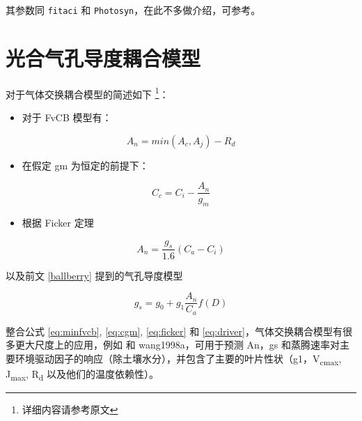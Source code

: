 \documentclass[]{krantz}
\providecommand{\tightlist}{%
  \setlength{\itemsep}{0pt}\setlength{\parskip}{0pt}}
\theoremstyle{definition}
\theoremstyle{definition}
\theoremstyle{definition}
\theoremstyle{remark}
\begin{document}
其参数同 \texttt{fitaci} 和
\texttt{Photosyn}，在此不多做介绍，可参考\citep[\citet{Buckley2014Is},
\citet{Medlyn2011Reconciling}]{Cowan1977Stomatal}。

\cleardoublepage

\chapter{光合气孔导度耦合模型}\label{photo_stomo}

\citet{Duursma2015Plantecophys} 对于气体交换耦合模型的简述如下
\footnote{详细内容请参考原文}：

\begin{itemize}
\tightlist
\item
  对于 FvCB 模型有：
\end{itemize}

\begin{equation}
A_n = min(A_c, A_j)-R_d
\label{eq:minfvcb}
\end{equation}

\begin{itemize}
\tightlist
\item
  在假定 gm 为恒定的前提下：
\end{itemize}

\begin{equation}
C_c = C_i - \frac{A_n}{g_m}
\label{eq:cgm}
\end{equation}

\begin{itemize}
\tightlist
\item
  根据 Ficker 定理
\end{itemize}

\begin{equation}
A_n = \frac{g_s}{1.6}(C_a - C_i)
\label{eq:ficker}
\end{equation}

以及前文 \ref{ballberry} 提到的气孔导度模型

\begin{equation}
g_s = g_0 + g_1 \frac{A_n}{C_a} f(D)
\label{eq:driver}
\end{equation}

整合公式 \eqref{eq:minfvcb}, \eqref{eq:cgm}, \eqref{eq:ficker} 和
\eqref{eq:driver}，气体交换耦合模型有很多更大尺度上的应用，例如
\citet{Duursma2012MAESPA} 和 wang1998a，可用于预测 An，gs
和蒸腾速率对主要环境驱动因子的响应（除土壤水分），并包含了主要的叶片性状（g1，V\textsubscript{cmax},
J\textsubscript{max}, R\textsubscript{d} 以及他们的温度依赖性）。
\end{document}
